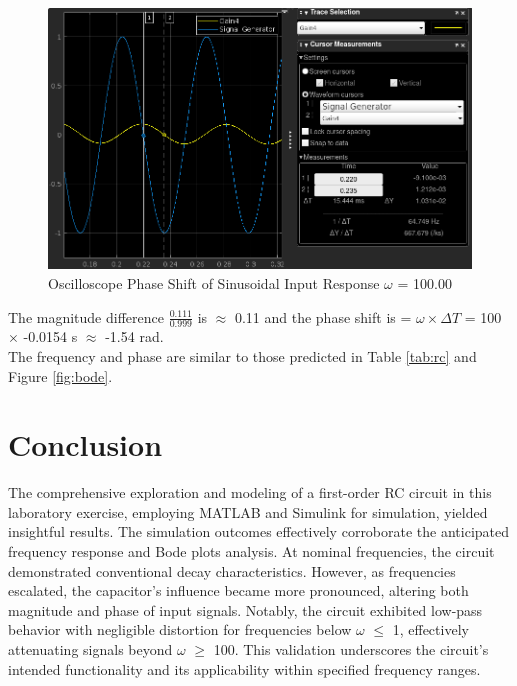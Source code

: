 \documentclass[12pt]{article}
\begin{document}
			\begin{figure}[H]
				\centering
				\includegraphics[width=1\linewidth]{"Code/Fig/w_100_ang.png"} 
				\caption{Oscilloscope Phase Shift of Sinusoidal Input Response $\omega$ = 100.00}
				\label{fig:slx_sine_input_output_w_100_ang}
			\end{figure}		
			The magnitude difference $\frac{0.111}{0.999}$ is $\approx$ 0.11 and the phase shift is = $\omega \times \Delta T$ = 100 $\times$ -0.0154 s  $\approx$  -1.54 rad. \\
			The frequency and phase are similar to those predicted in Table \ref{tab:rc} and Figure \ref{fig:bode}.  
		
	\section{Conclusion}
	The comprehensive exploration and modeling of a first-order RC circuit in this laboratory exercise, employing MATLAB and Simulink for simulation, yielded insightful results. The simulation outcomes effectively corroborate the anticipated frequency response and Bode plots analysis. At nominal frequencies, the circuit demonstrated conventional decay characteristics. However, as frequencies escalated, the capacitor's influence became more pronounced, altering both magnitude and phase of input signals. Notably, the circuit exhibited low-pass behavior with negligible distortion for frequencies below $\omega$ $\leq$ 1, effectively attenuating signals beyond $\omega$ $\geq$ 100. This validation underscores the circuit's intended functionality and its applicability within specified frequency ranges.
\end{document}
